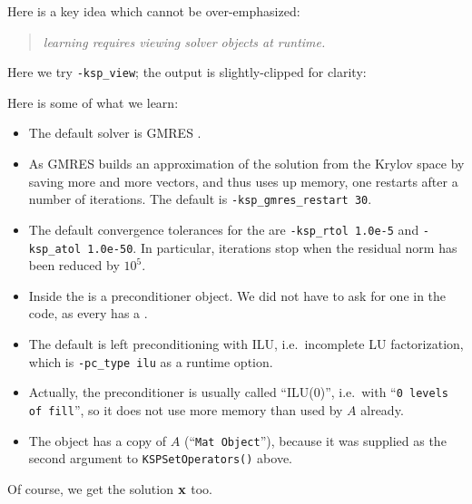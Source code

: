 Here is a key idea which cannot be over-emphasized:
\begin{quote}
\emph{learning \PETSc requires viewing \emph{solver} objects at runtime.}
\end{quote}
Here we try \texttt{-ksp\_view}; the output is slightly-clipped for clarity:
Here is some of what we learn:
\begin{itemize}
\item The default \pKSP solver is GMRES \citep{Saad2003}.
\item As GMRES builds an approximation of the solution from the Krylov space by saving more and more vectors, and thus uses up memory, one restarts after a number of iterations.  The default is \texttt{-ksp\_gmres\_restart 30}.
\item The default convergence tolerances for the \pKSP are \texttt{-ksp\_rtol 1.0e-5} and \texttt{-ksp\_atol 1.0e-50}.  In particular, \pKSP iterations stop when the residual norm has been reduced by $10^5$.
\item Inside the \pKSP is a \pPC preconditioner object.  We did not have to ask for one in the code, as every \pKSP has a \pPC.
\item The default \pPC is left preconditioning with ILU, i.e.~incomplete LU factorization, which is \texttt{-pc\_type ilu} as a runtime option.
\item Actually, the preconditioner is usually called ``ILU($0$)'', i.e.~with ``\texttt{0 levels of fill}'', so it does not use more memory than used by $A$ already.
\item The \pPC object has a copy of $A$ (``\texttt{Mat Object}''), because it was supplied as the second argument to \texttt{KSPSetOperators()} above.
\end{itemize}
Of course, we get the solution $\mathbf{x}$ too.

